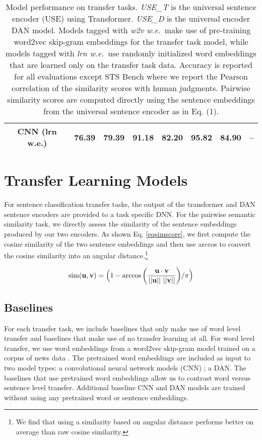 \documentclass[11pt,a4paper]{article}
\begin{document}
\begin{table*}[ht!]
\begin{center}
\begin{tabular}{|c|c|c|c|c|c|c|c|}
CNN (lrn w.e.)  & 76.39  & 79.39  & 91.18  & 82.20  & 95.82  &  84.90 & -- \\
\hline
\end{tabular}
\end{center}
\caption{Model performance on transfer tasks. \emph{USE\_T} is the universal sentence encoder (USE) using Transformer. \emph{USE\_D} is the universal encoder DAN model. Models tagged with \emph{w2v w.e.}\ make use of pre-training word2vec skip-gram embeddings for the transfer task model, while models tagged with \emph{lrn w.e.}\ use randomly initialized word embeddings that are learned only on the transfer task data. Accuracy is reported for all evaluations except STS Bench where we report the Pearson correlation of the similarity scores with human judgments. Pairwise similarity scores are computed directly using the sentence embeddings from the universal sentence encoder as in Eq. (1).
}
\label{tab:trans-model-performance}
\end{table*}

\section{Transfer Learning Models}

For sentence classification transfer tasks, the output of the transformer and DAN sentence encoders are provided to a task specific DNN. For the pairwise semantic similarity task, we directly assess the similarity of the sentence embeddings produced by our two encoders. As shown Eq. \ref{eqsimscore}, we first compute the cosine similarity of the two sentence embeddings and then use arccos to convert the cosine similarity into an angular distance.\footnote{We find that using a similarity based on angular distance performs better on average than raw cosine similarity.}

\begin{equation}
  \textrm{sim}({\bf u}, {\bf v}) = \Big(1 - \arccos\bigg(\frac{{\bf u} \cdot {\bf v}}{||{\bf u}|| ~ ||{\bf v}||}\bigg) / \pi\Big)
\label{eqsimscore}
\end{equation}

\subsection{Baselines}

For each transfer task, we include baselines that only make use of word level transfer and baselines that make use of no transfer learning at all. For word level transfer, we use word embeddings from a word2vec skip-gram model trained on a corpus of news data \cite{mikolov2013}. The pretrained word embeddings are included as input to two model types: a convolutional neural network models (CNN) \cite{kim2014}; a DAN. The baselines that use pretrained word embeddings allow us to contrast word versus sentence level transfer. Additional baseline CNN and DAN models are trained without using any pretrained word or sentence embeddings.
\end{document}

